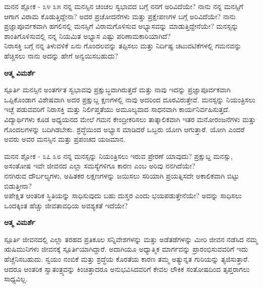 \newpage
\begin{mananam}{\mananamfont \large{ಮನನ ಶ್ಲೋಕ - ೩೪ ೩೫}}
\mananamtext ನನ್ನ ಮನಸ್ಸಿನ ಚಂಚಲ  ಸ್ವಭಾವದ ಬಗ್ಗೆ ನನಗೆ ಅರಿವಿದೆಯೇ? ನಾನು ನನ್ನ ಮನಸ್ಸಿಗೆ ಆಗಾಗ ವಿರಾಮ ಕೊಡುತ್ತಿದ್ದೇನಾ? ಅದರ ಪ್ರಚೋದನೆಗಳು ಮತ್ತು ಪ್ರಕ್ಷೇಪಣಗಳ ಬಗ್ಗೆ ಅರಿವಿದೆಯೇ? ನಾನು ಪ್ರಜ್ಞಾಪೂರ್ವಕವಾಗಿ  ಹಗಲಿನಲ್ಲಿ ಮನಸ್ಸಿಗೆ ವಿರಾಮಗೊಳಿಸುವ ಅಭ್ಯಾಸವನ್ನು ಮಾಡುತ್ತಿದ್ದೇನೆಯೇ? ಮನಸ್ಸನ್ನು ಶಾಂತಿಗೊಳಿಸುವಲ್ಲಿ ನನ್ನ ನಿಯಮಿತ ಅಭ್ಯಾಸ ಎಷ್ಟು ಪರಿಣಾಮಕಾರಿಯಾಗಿದೆ?\\
ನಿರಾಸಕ್ತಿ  ಬಗ್ಗೆ ನನ್ನ ತಿಳುವಳಿಕೆ ಏನು ಗೊಂದಲವನ್ನು ತಪ್ಪಿಸಲು ಮತ್ತು ನಿರ್ದಿಷ್ಟ ಚಟುವಟಿಕೆಗಳಲ್ಲಿ ಗಮನವನ್ನು ಹೆಚ್ಚಿಸಲು ನಾನು ಅದನ್ನು ಹೇಗೆ ಅನ್ವಯಿಸಬಹುದು?
\end{mananam}
\WritingHand\enspace\textbf{ಆತ್ಮ ವಿಮರ್ಶೆ}\\
\begin{inspiration}{\mananamfont \large ಸ್ಪೂರ್ತಿ}
\mananamtext ಮನಸ್ಸಿನ ಅಂತರ್ಗತ ಸ್ವಭಾವವು ಪ್ರಕ್ಷುಬ್ಧವಾಗಿರುತ್ತದೆ ಮತ್ತು ನಾವು ಇದನ್ನು ಪ್ರಜ್ಞಾಪೂರ್ವಕವಾಗಿ  ಒಪ್ಪಿಕೊಂಡಾಗ ವಿಶೇಷವಾಗಿ ಅದರ ಪ್ರಕ್ಷುಬ್ದ ಕ್ಷಣಗಳಲ್ಲಿ ನಾವು ಅದರಿಂದ ದೂರವಿರುತ್ತೇವೆ. ಮನಸ್ಸನ್ನು ನಿಯಂತ್ರಿಸಲು ಇಚ್ಛೆ ಪಡುವವರಿಗೆ ನಿರಾಸಕ್ತಿ ಮತ್ತು ನಿರ್ಲಿಪ್ತತೆಯು ಅಮೂಲ್ಯವಾದ ಸಾಧನವಾಗಿ ಕಾರ್ಯನಿರ್ವಹಿಸುತ್ತದೆ. ವಿದ್ಯಾರ್ಥಿಗಳು ಕೂಡ ಅಧ್ಯಯನದ ಮೇಲೆ ಗಮನ ಕೇಂದ್ರೀಕರಿಸಲು ತಾತ್ಕಾಲಿಕವಾಗಿ ಇತರ ಮನೋರಂಜನೆಗಳು ಮತ್ತು ಗೊಂದಲಗಳನ್ನು ಬದಿಗಿಡಬೇಕು. ಶ್ರದ್ಧೆಯಿಂದ ಅಭ್ಯಾಸ ಮಾಡಿದರೆ ಒಬ್ಬರು ಯೋಗಿ ಆಗುತ್ತಾರೆ. ಯೋಗಿ ಎಂದರೆ ಅವರು ಅವರ ಮನಸ್ಸಿನ ಮತ್ತು ಪ್ರಪಂಚದ ಯಜಮಾನ.    
\end{inspiration}
\newpage



\newpage
\begin{mananam}{\mananamfont \large{ಮನನ ಶ್ಲೋಕ - ೩೭ ೩೮}}
\mananamtext ನನ್ನ ಮನಸ್ಸನ್ನು ನಿಯಂತ್ರಿಸಲು ಇರುವ ಪ್ರೇರಣೆ ಯಾವುದು?
ಪ್ರಕ್ಷುಬ್ದ ಮನಸ್ಸು, ಅಸಂತೋಷ ಇವೇ ಜೀವನದ ಎಲ್ಲಾ ಸಮಸ್ಯೆಗಳಿಗೂ ಕಾರಣ ಎಂಬ ಅರಿವು ನನಗಿದೆಯೇ?\\
ನನಗಿರುವ ದೌರ್ಬಲ್ಯಗಳು, ಅಹಿತಕರ ಲಕ್ಷಣಗಳನ್ನು ಜಯಿಸಲು ಸರಿಯಾಗಿ ಪ್ರಯತ್ನಿಸದೇ ಅಕಾಲಿಕವಾಗಿ ಬಿಟ್ಟು ಬಿಡುತ್ತೀನಾ?\\
ಅಪೇಕ್ಷಿತ ಆಂತರಿಕ ಸ್ಥಿತಿಯನ್ನು ಸಾಧಿಸುವುದು ಬಹು ದುಸ್ತರ ಎಂದು ಭಯಪಡುತ್ತೇನೆಯೇ? ಅದನ್ನು ಸಾಧಿಸಲು ಒಂದಕ್ಕಿಂತ ಹೆಚ್ಚು ಜೀವತಾವಧಿಯ ಅವಶ್ಯಕತೆ ಇದೆಯೇ?
\end{mananam}
\WritingHand\enspace\textbf{ಆತ್ಮ ವಿಮರ್ಶೆ}\\
\begin{inspiration}{\mananamfont \large ಸ್ಪೂರ್ತಿ}
\mananamtext ಜೀವನದಲ್ಲಿ ಎಲ್ಲಾ ತರಹದ ಪ್ರತಿಕೂಲ ಸನ್ನಿವೇಶಗಳನ್ನು ಮತ್ತು ಅಡೆತಡೆಗಳನ್ನು ಮೀರಿ ಜೀವನ ನಡೆಸಿದ ನಮ್ಮ ಋಷಿಮುನಿಗಳು ಜೀವನಕ್ಕೆ ಸ್ಪೂರ್ತಿಯಾಗಿದ್ದಾರೆ. ಅದಾಗಿಯೂ ಅಧ್ಯಾತ್ಮಿಕ ಮಾರ್ಗವನ್ನು ಪ್ರಾರಂಭಿಸುವವರಿಗೆ ಇದು ಹೆಚ್ಚೆನಿಸಬಹುದು. ಸ್ವಯಂ ನಂಬಿಕೆ ಮತ್ತು ಶ್ರದ್ಧೆಯ ಕೊರತೆಯ ಕಾರಣ ತಮ್ಮ ಅತ್ಯುನ್ನತ ಗುರಿಯನ್ನು ತ್ಯಜಿಸುತ್ತಾರೆ. ಆದರೂ ಆಂತರಿಕ ಸ್ವಾತಂತ್ರ್ಯವನ್ನು ಕಿಂಚಿತ್ತಾದರೂ ಅನುಭವಿಸಿದವರಿಗೆ ಕೇವಲ ಲೌಕಿಕ ಸಂತೋಷದಿಂದ ತೃಪ್ತರಾಗಲು ಸಾಧ್ಯವಿಲ್ಲ.
\end{inspiration}
\newpage


